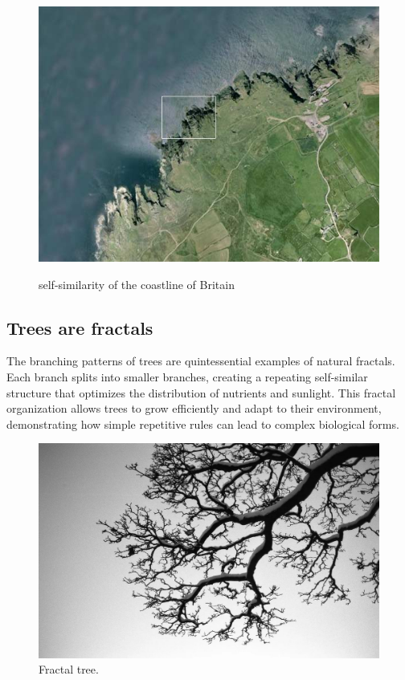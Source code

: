 \documentclass[12pt]{article}
\begin{document}
\begin{figure}[H]
\begin{minipage}[b]{0.5\textwidth}
        \label{fig:uk3}
    \end{minipage}
    \hspace{0.05\textwidth} %
    \begin{minipage}[b]{0.5\textwidth}
        \centering
        \includegraphics[width=\textwidth]{assets/uk4.jpg}
        \label{fig:uk4}
    \end{minipage}
        \caption{self-similarity of the coastline of Britain}
\end{figure}

\subsection{Trees are fractals}
The branching patterns of trees are quintessential examples of natural fractals. Each branch splits into smaller branches, creating a repeating self-similar structure that optimizes the distribution of nutrients and sunlight. This fractal organization allows trees to grow efficiently and adapt to their environment, demonstrating how simple repetitive rules can lead to complex biological forms.

\begin{figure}[H]
\centering
\includegraphics[width=\textwidth]{assets/fractal-tree.jpg}
\caption{Fractal tree.}
\label{fig:fractal-tree}
\end{figure}
\end{document}
